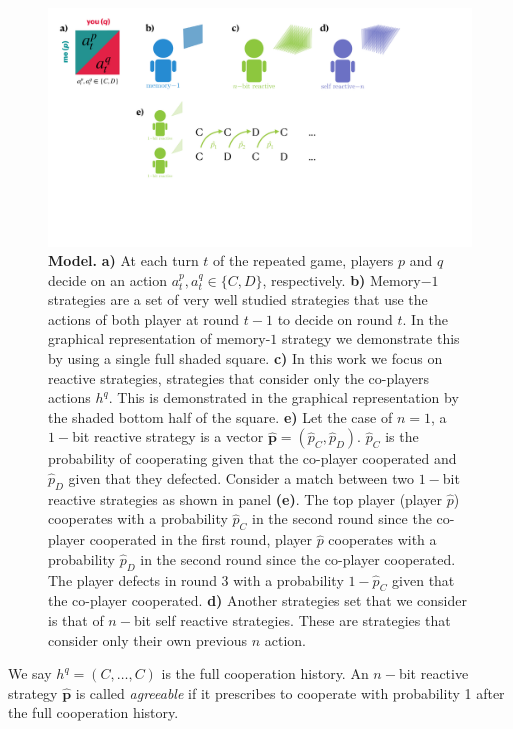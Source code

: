 \documentclass{article}
\theoremstyle{definition}
\begin{document}
\begin{figure}[h!]
    \centering
    \includegraphics[width=\textwidth]{figures/conceptual_figure_model.pdf}
    \caption{\textbf{Model.} \textbf{a)} At each turn $t$ of the repeated game,
    players \(p\) and \(q\) decide on an action \(a^{p}_{t}, a^{q}_{t} \in \{C,
    D\}\), respectively. \textbf{b)} Memory$-1$ strategies are a set of very well
    studied strategies that use the actions of both player at round $t-1$ to
    decide on round $t$. In the graphical representation of memory-$1$ strategy
    we demonstrate this by using a single full shaded square. \textbf{c)} In this work we
    focus on reactive strategies, strategies that consider only the
    co-players actions $h^q$. This is demonstrated in the graphical representation
    by the shaded bottom half of the square. \textbf{e)} Let the case of $n=1$, a $1-$bit
    reactive strategy is a vector $\mathbf{\hat{p}}=(\hat{p}_{C}, \hat{p}_{D})$. $\hat{p}_C$
    is the probability of cooperating given that the co-player cooperated and $\hat{p}_D$
    given that they defected. Consider a 
    match between two $1-$bit reactive strategies as shown in panel \textbf{(e)}. The top
    player (player $\hat{p}$) cooperates with a probability $\hat{p}_C$ in the
    second round since the co-player cooperated in the first round, player
    $\hat{p}$ cooperates with a probability $\hat{p}_D$ in the second round
    since the co-player cooperated. The player defects in round 3 with a probability $1 -
    \hat{p}_C$ given that the co-player cooperated. \textbf{d)} Another strategies set that
    we consider is that of $n-$bit self reactive strategies. These are strategies that
    consider only their own previous $n$ action.}
\end{figure}

We say $\!h^q\!=\!(C,\ldots,C)$ is the full cooperation history. An $n-$bit
reactive strategy $\mathbf{\hat{p}}$ is called {\it agreeable} if it prescribes to
cooperate with probability 1 after the full cooperation history.
\end{document}
